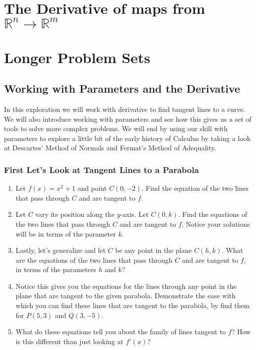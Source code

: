 \documentclass{amsbook}
\begin{document}
\chapter{The Derivative of maps from $\mathbb{R}^n \to \mathbb{R}^m$}

\chapter{Longer Problem Sets}
    \section*{Working with Parameters and the Derivative}
    	In this exploration we will work with derivative to find tangent lines to a curve. We will also introduce working with parameters and see how this gives us a set of tools to solve more complex problems. We will end by using our skill with parameters to explore a little bit of the early history of Calculus by taking a look at Descartes' Method of Normals and Fermat's Method of Adequality.
    	\subsection*{First Let's Look at Tangent Lines to a Parabola}
    		\begin{enumerate}
    			\item Let $f(x)=x^2+1$ and point $C(0,-2)$. Find the equation of the two lines that pass through $C$ and are tangent to $f$.\\
    			
				\item Let $C$ vary its position along the $y$-axis. Let $C(0,k)$. Find the equations of the two lines that pass through $C$ and are tangent to $f$. Notice your solutions will be in terms of the 				parameter $k$.\\
				
				\item Lastly, let's generalize and let $C$ be any point in the plane $C(h,k)$. What are the equations of the two lines that pass through $C$ and are tangent to $f$, in terms of the parameters $h$ and $k$? \\
				\item Notice this gives you the equations for the lines through any point in the plane that are tangent to the given parabola. Demonstrate the ease with which you can find these lines that are tangent to the parabola, by find them for $P(5,3)$ and $Q(3,-5)$.\\
				\item What do these equations tell you about the family of lines tangent to $f$? How is this different than just looking at $f'(x)$?\\
    		\end{enumerate}
    		
\end{document}
